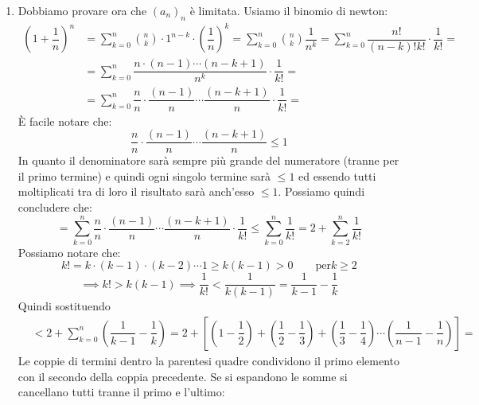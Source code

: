 {\begin{enumerate}
        \item Dobbiamo provare ora che $(a_n)_n$ è limitata. Usiamo il binomio di newton:
            \begin{align*}
                (1+\dfrac{1}{n})^n &= \sum_{k = 0}^{n} \binom{n}{k} \cdot 1^{n-k} \cdot \left(\dfrac{1}{n}\right)^k = \sum_{k = 0}^{n} \binom{n}{k}\dfrac{1}{n^k} = \sum_{k = 0}^{n} \dfrac{n!}{(n-k)!k!}\cdot\dfrac{1}{k!}=\\
                &= \sum_{k = 0}^{n} \dfrac{n \cdot (n-1) \cdots (n-k+1)}{n^k} \cdot \dfrac{1}{k!} =\\
                &= \sum_{k = 0}^{n} \dfrac{n}{n} \cdot \dfrac{(n-1)}{n} \cdots \dfrac{(n-k+1)}{n} \cdot \dfrac{1}{k!} =
            \end{align*}
            È facile notare che:
            \begin{equation*}
                \dfrac{n}{n} \cdot \dfrac{(n-1)}{n} \cdots \dfrac{(n-k+1)}{n} \leq 1
            \end{equation*}
            In quanto il denominatore sarà sempre più grande del numeratore (tranne per il primo termine) e quindi ogni singolo termine sarà $\leq 1$ ed essendo tutti moltiplicati tra di loro il risultato sarà anch'esso $\leq 1$. Possiamo quindi concludere che:
            \begin{equation*}
                = \sum_{k = 0}^{n} \dfrac{n}{n} \cdot \dfrac{(n-1)}{n} \cdots \dfrac{(n-k+1)}{n} \cdot \dfrac{1}{k!} \leq \sum_{k = 0}^{n} \dfrac{1}{k!} = 2 + \sum_{k = 2}^{n} \dfrac{1}{k!}
            \end{equation*}
            Possiamo notare che:
            \begin{equation*}
                k! = k\cdot (k-1)\cdot (k-2) \cdots 1 \geq k (k-1) > 0 \qquad \text{per} k\geq 2
            \end{equation*}
            \begin{equation*}
                \implies k! > k(k-1) \implies \dfrac{1}{k!} < \dfrac{1}{k(k-1)} = \dfrac{1}{k-1} - \dfrac{1}{k}
            \end{equation*}
            Quindi sostituendo
            \begin{align*}
                &< 2 + \sum_{k = 0}^{n} \left(\dfrac{1}{k-1} - \dfrac{1}{k}\right) = 2 + \left[ \left(1-\dfrac{1}{2}\right) + \left(\dfrac{1}{2}-\dfrac{1}{3}\right) + \left(\dfrac{1}{3}-\dfrac{1}{4}\right) \cdots \left(\dfrac{1}{n-1}-\dfrac{1}{n}\right)\right]=
            \end{align*}
            Le coppie di termini dentro la parentesi quadre condividono il primo elemento con il secondo della coppia precedente. Se si espandono le somme si cancellano tutti tranne il primo e l'ultimo:

\end{enumerate}}
